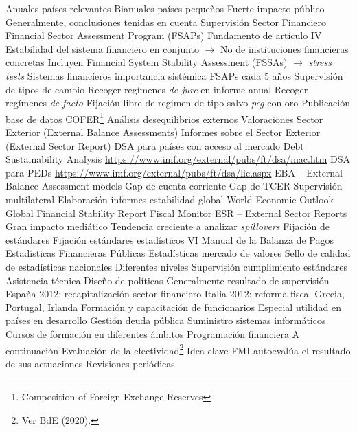 \documentclass{nuevotema}
\begin{document}
\begin{esquemal}
				\4 Anuales países relevantes
				\4 Bianuales países pequeños
				\4 Fuerte impacto público
				\4 Generalmente, conclusiones tenidas en cuenta
			\3 Supervisión Sector Financiero
				\4 Financial Sector Assessment Program (FSAPs)
				\4[] Fundamento de artículo IV
				\4[] Estabilidad del sistema financiero en conjunto
				\4[] $\to$ No de instituciones financieras concretas
				\4 Incluyen Financial System Stability Assessment (FSSAs)
				\4[] $\to$ \textit{stress tests}
				\4 Sistemas financieros importancia sistémica
				\4[] FSAPs cada 5 años
			\3 Supervisión de tipos de cambio
				\4 Recoger regímenes \textit{de jure} en informe anual
				\4 Recoger regímenes \textit{de facto}
				\4 Fijación libre de regimen de tipo salvo \textit{peg} con oro
				\4 Publicación base de datos COFER\footnote{Composition of Foreign Exchange Reserves}
				\4 Análisis desequilibrios externos
				\4[] Valoraciones Sector Exterior (External Balance Assessments)
				\4[] Informes sobre el Sector Exterior (External Sector Report)
			\3 DSA para países con acceso al mercado
				\4 Debt Sustainability Analysis
				\4 \url{https://www.imf.org/external/pubs/ft/dsa/mac.htm}
			\3 DSA para PEDs
				\4 \url{https://www.imf.org/external/pubs/ft/dsa/lic.aspx}
			\3 EBA -- External Balance Assessment models
				\4 Gap de cuenta corriente
				\4 Gap de TCER
			\3 Supervisión multilateral
				\4 Elaboración informes estabilidad global
				\4 World Economic Outlook
				\4 Global Financial Stability Report
				\4 Fiscal Monitor
				\4 ESR -- External Sector Reports
				\4 Gran impacto mediático
				\4 Tendencia creciente a analizar \textit{spillovers}
			\3 Fijación de estándares
				\4 Fijación estándares estadísticos
				\4 VI Manual de la Balanza de Pagos
				\4 Estadísticas Financieras Públicas
				\4 Estadísticas mercado de valores
				\4 Sello de calidad de estadísticas nacionales
				\4[] Diferentes niveles
				\4 Supervisión cumplimiento estándares
		\2 Asistencia técnica
			\3 Diseño de políticas
				\4 Generalmente resultado de supervisión
				\4 España 2012: recapitalización sector financiero
				\4 Italia 2012: reforma fiscal
				\4 Grecia, Portugal, Irlanda
			\3 Formación y capacitación de funcionarios
				\4 Especial utilidad en países en desarrollo
				\4 Gestión deuda pública
				\4 Suministro sistemas informáticos
				\4 Cursos de formación en diferentes ámbitos
			\3 Programación financiera
				\4 A continuación
		\2 Evaluación de la efectividad\footnote{Ver BdE (2020).}
			\3 Idea clave
				\4 FMI autoevalúa el resultado de sus actuaciones
				\4 Revisiones periódicas

\end{esquemal}
\end{document}
